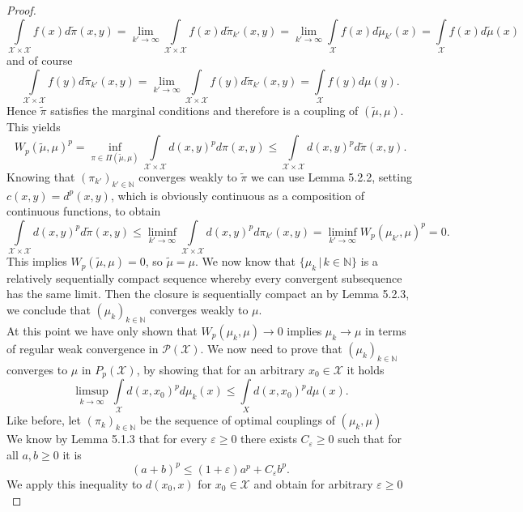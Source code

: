 \documentclass[11pt,a4paper]{article}
\begin{document}
\begin{proof}
\[
\int\limits_{\mathcal{X\times{}X}}f(x)d\tilde{\pi}(x,y) = \lim\limits_{{k'}\rightarrow{}\infty}\int\limits_{\mathcal{X\times{}X}}f(x)d\tilde{\pi}_{k'}(x,y) = \lim\limits_{{k'}\rightarrow{}\infty}\int\limits_{\mathcal{X}}f(x)d\tilde{\mu}_{k'}(x) = \int\limits_{\mathcal{X}}f(x)d\tilde{\mu}(x)
\] 
and of course
\[
\int\limits_{\mathcal{X\times{}X}}f(y)d\tilde{\pi}_{k'}(x,y) = \lim\limits_{{k'}\rightarrow{}\infty}\int\limits_{\mathcal{X\times{}X}}f(y)d\tilde{\pi}_{k'}(x,y) = \int\limits_{\mathcal{X}}f(y)d\mu(y).
\]
Hence $\tilde{\pi}$ satisfies the marginal conditions and therefore is a coupling of $(\tilde{\mu},\mu)$.\\ This yields 
\[
W_p(\tilde{\mu},\mu)^p = \inf\limits_{\pi\in\Pi(\tilde{\mu},\mu)}\int\limits_{\mathcal{X\times{}X}}d(x,y)^pd\pi(x,y) \leq \int\limits_{\mathcal{X\times{}X}}d(x,y)^pd\tilde{\pi}(x,y).
\]
Knowing that $(\pi_{k'})_{k'\in\mathbb{N}}$ converges weakly to $\tilde{\pi}$ we can use Lemma 5.2.2, setting $c(x,y)=d^p(x,y)$, which is obviously continuous as a composition of continuous functions, to obtain
\[
\int\limits_{\mathcal{X\times{}X}}d(x,y)^pd\tilde{\pi}(x,y) \leq \liminf_{k'\rightarrow{}\infty}\int\limits_{\mathcal{X\times{}X}}d(x,y)^pd\pi_{k'}(x,y) = \liminf_{k'\rightarrow{}\infty}W_p(\mu_{k'},\mu)^p = 0.
\]
This implies $W_p(\tilde{\mu},\mu)=0$, so $\tilde{\mu} = \mu$. We now know that $\{\mu_k\,|\,k\in\mathbb{N}\}$ is a relatively sequentially compact sequence whereby every convergent subsequence has the same limit. Then the closure is sequentially compact an by Lemma 5.2.3, we conclude that $(\mu_k)_{k\in\mathbb{N}}$ converges weakly to $\mu$. \vspace{2em}\\
At this point we have only shown that $W_p(\mu_k,\mu)\rightarrow{}0$ implies $\mu_k\rightarrow{}\mu$ in terms of regular weak convergence in $\mathcal{P(X)}$. We now need to prove that $(\mu_k)_{k\in\mathbb{N}}$ converges to $\mu$ in $P_p(\mathcal{X})$, by showing that for an arbitrary $x_0\in\mathcal{X}$ it holds
\[
\limsup\limits_{k\rightarrow{}\infty}\int\limits_{\mathcal{X}}d(x,x_0)^pd\mu_k(x) \leq{}\int\limits_{X}d(x,x_0)^pd\mu(x).
\]
Like before, let $(\pi_k)_{k\in\mathbb{N}}$ be the sequence of optimal couplings of $(\mu_k,\mu)$\\
We know by Lemma 5.1.3 that for every $\varepsilon\geq{}0$ there exists $C_{\varepsilon}\geq{}0$ such that for all $a,b\geq{}0$ it is 
\[
(a+b)^p\leq{}(1+\varepsilon)a^p + C_{\varepsilon}b^p.
\]
We apply this inequality to $d(x_0,x)$ for $x_0\in\mathcal{X}$ and obtain for arbitrary $\varepsilon\geq{}0$ \vspace{0.5em}\\

\end{proof}
\end{document}
